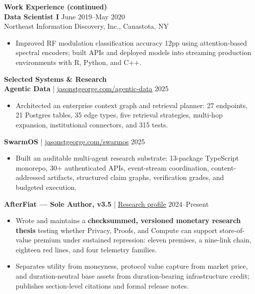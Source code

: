 \documentclass[10.5pt]{res}
\begin{document}
\begin{resume}
\newpage
{\bf Work Experience (continued)} \vspace{0.12 cm}\\
{\bf Data Scientist I} \hfill June 2019--May 2020\\
Northeast Information Discovery, Inc., Canastota, NY \\
\begin{itemize}[itemsep=1pt,topsep=2pt]
    \item Improved RF modulation classification accuracy 12pp using attention-based spectral encoders; built APIs and deployed models into streaming production environments with R, Python, and C++.
\end{itemize}

{\bf Selected Systems \& Research} \vspace{0.15 cm}\\
{\bf Agentic Data} | \href{https://jasonstgeorge.com/agentic-data}{jasonstgeorge.com/agentic-data} \hfill 2025\\
\begin{itemize}[itemsep=1pt,topsep=2pt]
    \item Architected an enterprise context graph and retrieval planner: 27 endpoints, 21 Postgres tables, 35 edge types, five retrieval strategies, multi-hop expansion, institutional connectors, and 315 tests.
\end{itemize}

{\bf SwarmOS} | \href{https://jasonstgeorge.com/swarmos}{jasonstgeorge.com/swarmos} \hfill 2025\\
\begin{itemize}[itemsep=1pt,topsep=2pt]
    \item Built an auditable multi-agent research substrate: 13-package TypeScript monorepo, 30+ authenticated APIs, event-stream coordination, content-addressed artifacts, structured claim graphs, verification grades, and budgeted execution.
\end{itemize}

{\bf AfterFiat --- Sole Author, v3.5} | \href{https://jasonstgeorge.com/afterfiat}{Research profile} \hfill 2024--Present\\
\begin{itemize}[itemsep=1pt,topsep=2pt]
    \item Wrote and maintains a \textbf{checksummed, versioned monetary research thesis} testing whether Privacy, Proofs, and Compute can support store-of-value premium under sustained repression: eleven premises, a nine-link chain, eighteen red lines, and four telemetry families.
    \item Separates utility from moneyness, protocol value capture from market price, and duration-neutral base assets from duration-bearing infrastructure credit; publishes section-level citations and formal release notes.
\end{itemize}


\end{resume}
\end{document}
